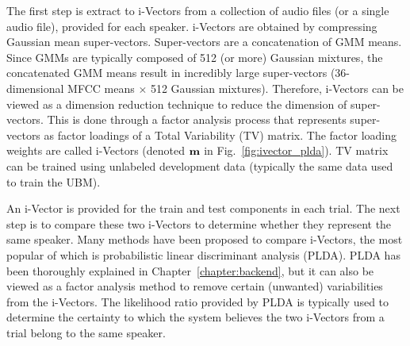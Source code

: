The first step is extract to i-Vectors from a collection of audio files (or a single audio file), provided for each speaker. 
i-Vectors are obtained by compressing Gaussian mean super-vectors. 
Super-vectors are a concatenation of GMM means. 
Since GMMs are typically composed of 512 (or more) Gaussian mixtures, the concatenated GMM means result in incredibly large super-vectors (36-dimensional MFCC means $\times$ 512 Gaussian mixtures). 
Therefore, i-Vectors can be viewed as a dimension reduction technique to reduce the dimension of super-vectors. 
This is done through a factor analysis process that represents super-vectors as factor loadings of a Total Variability (TV) matrix. 
The factor loading weights are called i-Vectors (denoted ${\bf m}$ in Fig.~\ref{fig:ivector_plda}). 
TV matrix can be trained using unlabeled development data (typically the same data used to train the UBM). 

An i-Vector is provided for the train and test components in each trial. 
The next step is to compare these two i-Vectors to determine whether they represent the same speaker. 
Many methods have been proposed to compare i-Vectors, the most popular of which is probabilistic linear discriminant analysis (PLDA). 
PLDA has been thoroughly explained in Chapter~\ref{chapter:backend}, but it can also be viewed as a factor analysis method to remove certain (unwanted) variabilities from the i-Vectors. 
The likelihood ratio provided by PLDA is typically used to determine the certainty to which the system believes the two i-Vectors from a trial belong to the same speaker. 

